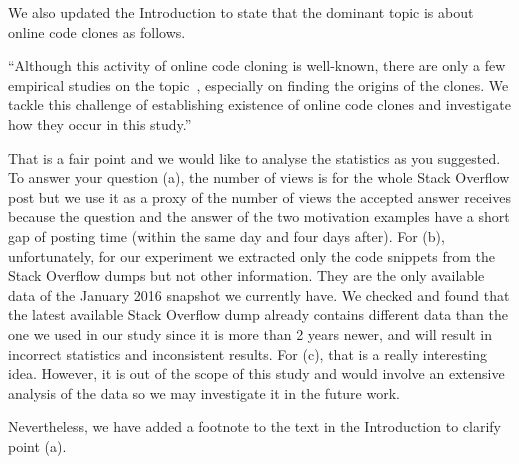 \documentclass[a4paper,twoside,10pt]{reviewresponse}
\begin{document}
We also updated the Introduction to state that the dominant topic is about
online code clones as follows.

``Although this activity of online code cloning is well-known, there are only a
few empirical studies on the topic~\citep{An2017,Abdalkareem2017,Baltes2017},
especially on finding the origins of the clones. We tackle this challenge of
establishing existence of online code clones and investigate how they occur in
this study.'' %


That is a fair point and we would like to analyse the statistics as you
suggested. To answer your question (a), the number of views is for the whole
Stack Overflow post but we use it as a proxy of the number of views the accepted
answer receives because the question and the answer of the two motivation
examples have a short gap of posting time (within the same day and four days
after). For (b), unfortunately, for our experiment we extracted only the code
snippets from the Stack Overflow dumps but not other information. They are the
only available data of the January 2016 snapshot we currently have. We checked
and found that the latest available Stack Overflow dump already contains
different data than the one we used in our study since it is more than 2
years newer, and will result in incorrect statistics and inconsistent results.
For (c), that is a really interesting idea. However, it is out of the scope of
this study and would involve an extensive analysis of the data so we may
investigate it in the future work.

Nevertheless, we have added a footnote to the text in the Introduction to
clarify point (a).
\end{document}
